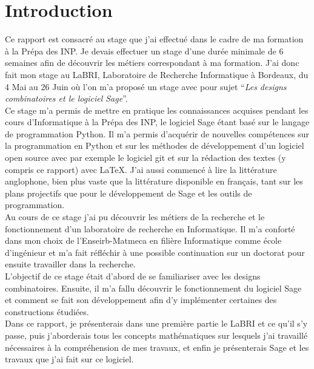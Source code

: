 \documentclass[a4paper]{article}
\begin{document}
\section*{Introduction}
Ce rapport est consacré au stage que j'ai effectué dans le cadre de ma formation à la Prépa des INP. Je devais effectuer un stage d'une durée minimale de 6 semaines afin de découvrir les métiers correspondant à ma formation.
J'ai donc fait mon stage au LaBRI, Laboratoire de Recherche Informatique à Bordeaux, du 4 Mai au 26 Juin où l'on m'a proposé un stage avec pour sujet ``\textit{Les designs combinatoires et le logiciel Sage}''.\\
Ce stage m'a permis de mettre en pratique les connaissances acquises pendant les cours d'Informatique à la Prépa des INP, le logiciel Sage étant basé sur le langage de programmation Python. Il m'a permis d'acquérir de nouvelles compétences sur la programmation en Python et sur les méthodes de développement d'un logiciel open source avec par exemple le logiciel git et sur la rédaction des textes (y compris ce rapport) avec \LaTeX. J'ai aussi commencé à lire la littérature anglophone, bien plus vaste que la littérature disponible en français, tant sur les plans projectifs que pour le développement de Sage et les outils de programmation. \\
Au cours de ce stage j'ai pu découvrir les métiers de la recherche et le fonctionnement d'un laboratoire de recherche en Informatique. Il m'a conforté dans mon choix de l'Enseirb-Matmeca en filière Informatique comme école d'ingénieur et m'a fait réfléchir à une possible continuation sur un doctorat pour ensuite travailler dans la recherche.\\
L'objectif de ce stage était d'abord de se familiariser avec les designs combinatoires. Ensuite, il m'a fallu découvrir le fonctionnement du logiciel Sage et comment se fait son développement afin d'y implémenter certaines des constructions étudiées.\bigskip \\
Dans ce rapport, je présenterais dans une première partie le LaBRI et ce qu'il s'y passe, puis j'aborderais tous les concepts mathématiques sur lesquels j'ai travaillé nécessaires à la compréhension de mes travaux, et enfin je présenterais Sage et les travaux que j'ai fait sur ce logiciel. 
\newpage
\end{document}
